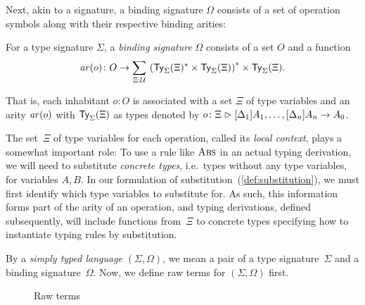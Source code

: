 Next, akin to a signature, a binding signature $\Omega$ consists of a set of operation symbols along with their respective binding arities:
\begin{defn}\label{def:binding-signature}
  For a type signature $\Sigma$, a \emph{binding signature} $\Omega$ consists of a set $O$ and a function
  \[
    \arity(o) \colon O \to \sm{\Xi : \UU} \left(\Type_\Sigma(\Xi)^* \times \Type_\Sigma(\Xi)\right)^* \times \Type_\Sigma(\Xi).
  \]
\end{defn}
That is, each inhabitant $o: O$  is associated with a set $\Xi$ of type variables and an arity $\mathit{ar}(o)$ with $\mathsf{Ty}_{\Sigma}(\Xi)$ as types denoted by $o\colon \Xi \mathrel{\rhd} [\Delta_{1}]A_{1}, \ldots, [\Delta_{n}]A_{n} \to A_0$.

The set~$\Xi$ of type variables for each operation, called its \emph{local context}, plays a somewhat important role:
To use a rule like $\textnormal{\textsc{Abs}}$ in an actual typing derivation, we will need to substitute \emph{concrete types}, i.e.\ types without any type variables, for variables $A, B$.
In our formulation of substitution~(\ref{def:substitution}), we must first identify which type variables to substitute for.
As such, this information forms part of the arity of an operation, and typing derivations, defined subsequently, will include functions from~$\Xi$ to concrete types specifying how to instantiate typing rules by substitution.

By a \emph{simply typed language} $(\Sigma, \Omega)$, we mean a pair of a type signature~$\Sigma$ and a binding signature~$\Omega$.
Now, we define raw terms for $(\Sigma, \Omega)$ first.

\begin{figure}
  \centering
  \small
  \caption{Raw terms}
  \label{fig:raw-terms}
\end{figure}


